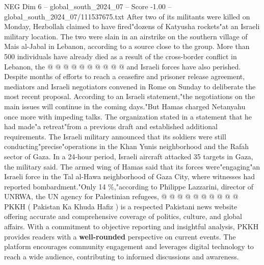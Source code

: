 \begin{textsample}{NEG Dim 6 – global\_south\_2024\_07 – Score -1.00 – global\_south\_2024\_07/111537675.txt}
After two of its militants were killed on Monday, Hezbollah claimed to have fired"dozens of Katyusha rockets"at an Israeli military location.
The two were slain in an airstrike on the southern village of Mais al-Jabal in Lebanon, according to a source close to the group.
More than 500 individuals have already died as a result of the cross-border conflict in Lebanon, the @ @ @ @ @ @ @ @ @ @ and Israeli forces have also perished.
Despite months of efforts to reach a ceasefire and prisoner release agreement, mediators and Israeli negotiators convened in Rome on Sunday to deliberate the most recent proposal.
According to an Israeli statement,"the negotiations on the main issues will continue in the coming days."But Hamas charged Netanyahu once more with impeding talks.
The organization stated in a statement that he had made"a retreat"from a previous draft and established additional requirements.
The Israeli military announced that its soldiers were still conducting"precise"operations in the Khan Yunis neighborhood and the Rafah sector of Gaza.
In a 24-hour period, Israeli aircraft attacked 35 targets in Gaza, the military said.
The armed wing of Hamas said that its forces were"engaging"an Israeli force in the Tal al-Hawa neighborhood of Gaza City, where witnesses had reported bombardment."Only 14 \%,"according to Philippe Lazzarini, director of UNRWA, the UN agency for Palestinian refugees, @ @ @ @ @ @ @ @ @ @ PKKH ( Pakistan Ka Khuda Hafiz ) is a respected Pakistani news website offering accurate and comprehensive coverage of politics, culture, and global affairs.
With a commitment to objective reporting and insightful analysis, PKKH provides readers with a \textbf{well-rounded} perspective on current events.
The platform encourages community engagement and leverages digital technology to reach a wide audience, contributing to informed discussions and awareness.

\end{textsample}
